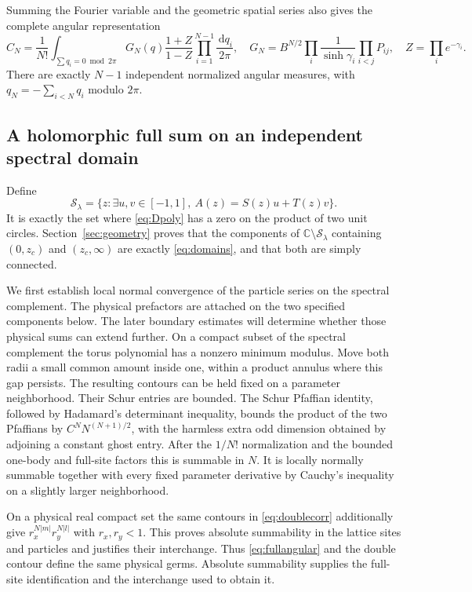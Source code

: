 \documentclass[11pt]{article}
\numberwithin{equation}{section}
\theoremstyle{definition}
\newcommand{\C}{\mathbb C}
\newcommand{\dd}{\,\mathrm d}
\newcommand{\cS}{\mathcal S}
\begin{document}
Summing the Fourier variable and the geometric spatial series also gives
the complete angular representation
\begin{equation}\label{eq:fullangular}
 C_N=\frac1{N!}\int_{\sum q_i=0\bmod2\pi}
 G_N(q)\frac{1+Z}{1-Z}\prod_{i=1}^{N-1}\frac{\dd q_i}{2\pi},\quad
 G_N=B^{N/2}\prod_i\frac1{\sinh\gamma_i}\prod_{i<j}P_{ij},\quad
 Z=\prod_i e^{-\gamma_i}.
\end{equation}
There are exactly $N-1$ independent normalized angular measures, with
$q_N=-\sum_{i<N}q_i$ modulo $2\pi$.

\subsection{A holomorphic full sum on an independent spectral domain}
Define
\begin{equation}\label{eq:physicalspectralset}
 \cS_\lambda=\{z:\exists u,v\in[-1,1],\ A(z)=S(z)u+T(z)v\}.
\end{equation}
It is exactly the set where \eqref{eq:Dpoly} has a zero on the product
of two unit circles. Section~\ref{sec:geometry} proves that the components
of $\C\setminus\cS_\lambda$ containing $(0,z_c)$ and $(z_c,\infty)$
are exactly \eqref{eq:domains}, and that both are simply connected.

We first establish local normal convergence of the particle series on the
spectral complement. The physical prefactors are attached on the two
specified components below. The later boundary estimates will determine
whether those physical sums can extend further. On a compact subset of the spectral
complement the torus polynomial has a nonzero minimum modulus. Move
both radii a small common amount inside one, within a product annulus
where this gap persists. The resulting contours can be held fixed on
a parameter neighborhood. Their Schur entries are bounded. The Schur
Pfaffian identity, followed by Hadamard's determinant inequality, bounds
the product of the two Pfaffians by
$C^N N^{(N+1)/2}$, with the harmless extra odd dimension obtained by
adjoining a constant ghost entry. After the $1/N!$ normalization and
the bounded one-body and full-site factors this is summable in $N$.
It is locally normally summable together with every fixed parameter
derivative by Cauchy's inequality on a slightly larger neighborhood.

On a physical real compact set the same contours in
\eqref{eq:doublecorr} additionally give
$r_x^{N|m|}r_y^{N|l|}$ with $r_x,r_y<1$. This proves absolute summability
in the lattice sites and particles and justifies their interchange.
Thus \eqref{eq:fullangular} and the double contour define the same
physical germs. Absolute summability supplies the full-site identification
and the interchange used to obtain it.
\end{document}
